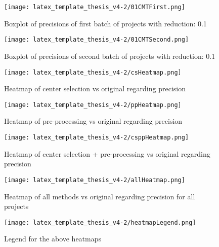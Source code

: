 \documentclass[twoside]{uva-inf-bachelor-thesis}
\begin{document}
\begin{figure}[h!]
    \centering
    \texttt{[image: latex\_template\_thesis\_v4-2/01CMTFirst.png]}
    \caption{Boxplot of precisions of first batch of projects with reduction: 0.1}
    \label{fig:boxplot01-1}
\end{figure}
\begin{figure}[h!]
    \centering
    \texttt{[image: latex\_template\_thesis\_v4-2/01CMTSecond.png]}
    \caption{Boxplot of precisions of second batch of projects with reduction: 0.1}
    \label{fig:boxplot01-2}
\end{figure}
\clearpage
\begin{figure}[h!]
    \centering
    \texttt{[image: latex\_template\_thesis\_v4-2/csHeatmap.png]}
    \caption{Heatmap of center selection vs original regarding precision}
    \label{fig:heatmapCS}
\end{figure}

\begin{figure}[h!]
    \centering
    \texttt{[image: latex\_template\_thesis\_v4-2/ppHeatmap.png]}
    \caption{Heatmap of pre-processing vs original regarding precision}
    \label{fig:heatmapPP}
\end{figure}

\begin{figure}[h!]
    \centering
    \texttt{[image: latex\_template\_thesis\_v4-2/csppHeatmap.png]}
    \caption{Heatmap of center selection + pre-processing vs original regarding precision}
    \label{fig:heatmapCSPP}
\end{figure}

\begin{figure}[h!]
    \centering
    \texttt{[image: latex\_template\_thesis\_v4-2/allHeatmap.png]}
    \caption{Heatmap of all methods vs original regarding precision for all projects}
    \label{fig:heatmapAll}
\end{figure}

\begin{figure}[h!]
    \centering
    \texttt{[image: latex\_template\_thesis\_v4-2/heatmapLegend.png]}
    \caption{Legend for the above heatmaps}
    \label{fig:heatmapLegend}
\end{figure}



\clearpage
\end{document}
